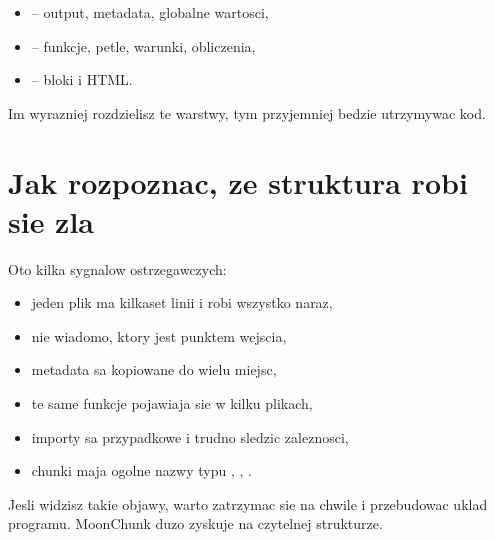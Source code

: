 \begin{itemize}
  \item {} -- output, metadata, globalne wartosci,
  \item {} -- funkcje, petle, warunki, obliczenia,
  \item {} -- bloki  i HTML.
\end{itemize}

Im wyrazniej rozdzielisz te warstwy, tym przyjemniej bedzie utrzymywac kod.

\section{Jak rozpoznac, ze struktura robi sie zla}
Oto kilka sygnalow ostrzegawczych:

\begin{itemize}
  \item jeden plik ma kilkaset linii i robi wszystko naraz,
  \item nie wiadomo, ktory  jest punktem wejscia,
  \item metadata sa kopiowane do wielu miejsc,
  \item te same funkcje pojawiaja sie w kilku plikach,
  \item importy sa przypadkowe i trudno sledzic zaleznosci,
  \item chunki maja ogolne nazwy typu , , .
\end{itemize}

Jesli widzisz takie objawy, warto zatrzymac sie na chwile i przebudowac uklad programu.
MoonChunk duzo zyskuje na czytelnej strukturze.
